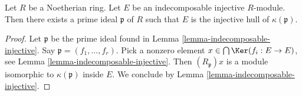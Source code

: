 \begin{lemma}
\label{lemma-indecomposable-injective-noetherian}
Let $R$ be a Noetherian ring. Let $E$ be an indecomposable injective
$R$-module. Then there exists a prime ideal $\mathfrak p$ of $R$ such that
$E$ is the injective hull of $\kappa(\mathfrak p)$.
\end{lemma}

\begin{proof}
Let $\mathfrak p$ be the prime ideal found in
Lemma \ref{lemma-indecomposable-injective}.
Say $\mathfrak p = (f_1, \ldots, f_r)$.
Pick a nonzero element $x \in \bigcap \Ker(f_i : E \to E)$,
see Lemma \ref{lemma-indecomposable-injective}.
Then $(R_\mathfrak p)x$ is a module isomorphic to $\kappa(\mathfrak p)$
inside $E$. We conclude by Lemma \ref{lemma-indecomposable-injective}.
\end{proof}
